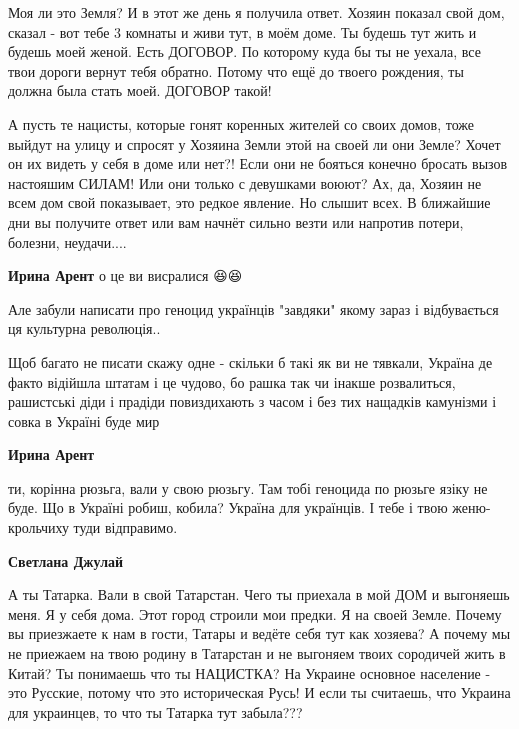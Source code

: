 \begin{itemize}
Моя ли это Земля? И в этот же день я получила ответ. Хозяин показал свой дом,
сказал - вот тебе 3 комнаты и живи тут, в моём доме. Ты будешь тут жить и
будешь моей женой. Есть ДОГОВОР. По которому куда бы ты не уехала, все твои
дороги вернут тебя обратно. Потому что ещё до твоего рождения, ты должна была
стать моей. ДОГОВОР такой!

А пусть те нацисты, которые гонят коренных жителей со своих домов, тоже выйдут
на улицу и спросят у Хозяина Земли этой на своей ли они Земле? Хочет он их
видеть у себя в доме или нет?! Если они не бояться конечно бросать вызов
настояшим СИЛАМ! Или они только с девушками воюют? Ах, да, Хозяин не всем дом
свой показывает, это редкое явление. Но слышит всех. В ближайшие дни вы
получите ответ или вам начнёт сильно везти или напротив потери, болезни,
неудачи....

\begin{itemize}

\textbf{Ирина Арент} о це ви висралися 😆😆

Але забули написати про геноцид українців "завдяки" якому зараз і відбувається
ця культурна революція..

Щоб багато не писати скажу одне - скільки б такі як ви не тявкали, Україна де
факто відійшла штатам і це чудово, бо рашка так чи інакше розвалиться,
рашистські діди і прадіди повиздихають з часом і без тих нащадків камунізми і
совка в Україні буде мир



\textbf{Ирина Арент} 

ти, корінна рюзьга, вали у свою рюзьгу. Там тобі геноцида по рюзьге язіку не
буде. Що в Україні робиш, кобила? Україна для українців. І тебе і твою
женю-крольчиху туди відправимо.



\textbf{Светлана Джулай} 

А ты Татарка. Вали в свой Татарстан. Чего ты приехала в мой ДОМ и выгоняешь
меня. Я у себя дома. Этот город строили мои предки. Я на своей Земле. Почему вы
приезжаете к нам в гости, Татары и ведёте себя тут как хозяева? А почему мы не
приежаем на твою родину в Татарстан и не выгоняем твоих сородичей жить в Китай?
Ты понимаешь что ты НАЦИСТКА? На Украине основное население - это Русские,
потому что это историческая Русь! И если ты считаешь, что Украина для
украинцев, то что ты Татарка тут забыла???



\end{itemize}
\end{itemize}
